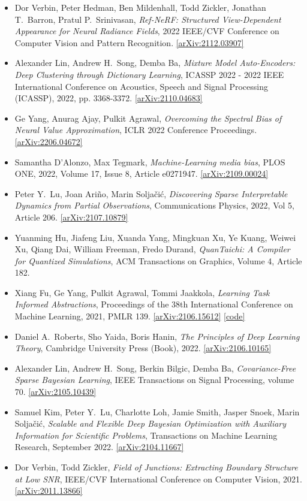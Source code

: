 \begin{itemize}
\item Dor Verbin, Peter Hedman, Ben Mildenhall, Todd Zickler, Jonathan T.\  Barron, Pratul P.\  Srinivasan, \textit{Ref-NeRF: Structured View-Dependent Appearance for Neural Radiance Fields}, 2022 IEEE/CVF Conference on Computer Vision and Pattern Recognition. \href{https://arxiv.org/abs/2112.03907}{[arXiv:2112.03907]} 
\item Alexander Lin, Andrew H.\  Song, Demba Ba, \textit{Mixture Model Auto-Encoders: Deep Clustering through Dictionary Learning}, ICASSP 2022 - 2022 IEEE International Conference on Acoustics, Speech and Signal Processing (ICASSP), 2022, pp. 3368-3372. \href{https://arxiv.org/abs/2110.04683}{[arXiv:2110.04683]} 
\item Ge Yang, Anurag Ajay, Pulkit Agrawal, \textit{Overcoming the Spectral Bias of Neural Value Approximation}, ICLR 2022 Conference Proceedings. \href{https://arxiv.org/abs/2206.04672}{[arXiv:2206.04672]} 
\item Samantha D'Alonzo, Max Tegmark, \textit{Machine-Learning media bias}, PLOS ONE, 2022, Volume 17, Issue 8, Article e0271947. \href{https://arxiv.org/abs/2109.00024}{[arXiv:2109.00024]} 
\item Peter Y.\  Lu, Joan Ariño, Marin Soljačić, \textit{Discovering Sparse Interpretable Dynamics from Partial Observations}, Communications Physics, 2022, Vol 5, Article 206. \href{https://arxiv.org/abs/2107.10879}{[arXiv:2107.10879]} 
\item Yuanming Hu, Jiafeng Liu, Xuanda Yang, Mingkuan Xu, Ye Kuang, Weiwei Xu, Qiang Dai, William Freeman, Fredo Durand, \textit{QuanTaichi: A Compiler for Quantized Simulations}, ACM Transactions on Graphics, Volume 4, Article 182. 
\item Xiang Fu, Ge Yang, Pulkit Agrawal, Tommi Jaakkola, \textit{Learning Task Informed Abstractions}, Proceedings of the 38th International Conference on Machine Learning, 2021, PMLR 139. \href{https://arxiv.org/abs/2106.15612}{[arXiv:2106.15612]}  \href{https://xiangfu.co/tia}{[code]} 
\item Daniel A.\  Roberts, Sho Yaida, Boris Hanin, \textit{The Principles of Deep Learning Theory}, Cambridge University Press (Book), 2022. \href{https://arxiv.org/abs/2106.10165}{[arXiv:2106.10165]} 
\item Alexander Lin, Andrew H.\  Song, Berkin Bilgic, Demba Ba, \textit{Covariance-Free Sparse Bayesian Learning}, IEEE Transactions on Signal Processing, volume 70. \href{https://arxiv.org/abs/2105.10439}{[arXiv:2105.10439]} 
\item Samuel Kim, Peter Y.\  Lu, Charlotte Loh, Jamie Smith, Jasper Snoek, Marin Soljačić, \textit{Scalable and Flexible Deep Bayesian Optimization with Auxiliary Information for Scientific Problems}, Transactions on Machine Learning Research, September 2022. \href{https://arxiv.org/abs/2104.11667}{[arXiv:2104.11667]} 
\item Dor Verbin, Todd Zickler, \textit{Field of Junctions: Extracting Boundary Structure at Low SNR}, IEEE/CVF International Conference on Computer Vision, 2021. \href{https://arxiv.org/abs/2011.13866}{[arXiv:2011.13866]} 
\end{itemize}